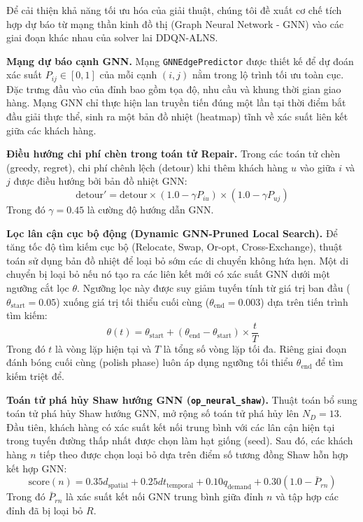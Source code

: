 \documentclass[13pt,a4paper]{extarticle}
\begin{document}
Để cải thiện khả năng tối ưu hóa của giải thuật, chúng tôi đề xuất cơ chế tích hợp dự báo từ mạng thần kinh đồ thị (Graph Neural Network - GNN) vào các giai đoạn khác nhau của solver lai DDQN-ALNS.

\textbf{Mạng dự báo cạnh GNN.}
Mạng \texttt{GNNEdgePredictor} được thiết kế để dự đoán xác suất $P_{ij} \in [0, 1]$ của mỗi cạnh $(i, j)$ nằm trong lộ trình tối ưu toàn cục. Đặc trưng đầu vào của đỉnh bao gồm tọa độ, nhu cầu và khung thời gian giao hàng. Mạng GNN chỉ thực hiện lan truyền tiến đúng một lần tại thời điểm bắt đầu giải thực thể, sinh ra một bản đồ nhiệt (heatmap) tĩnh về xác suất liên kết giữa các khách hàng.

\textbf{Điều hướng chi phí chèn trong toán tử Repair.}
Trong các toán tử chèn (greedy, regret), chi phí chênh lệch (detour) khi thêm khách hàng $u$ vào giữa $i$ và $j$ được điều hướng bởi bản đồ nhiệt GNN:
\begin{equation}
  \text{detour}' = \text{detour} \times \left(1.0 - \gamma P_{iu}\right) \times \left(1.0 - \gamma P_{uj}\right)
\end{equation}
Trong đó $\gamma = 0.45$ là cường độ hướng dẫn GNN.

\textbf{Lọc lân cận cục bộ động (Dynamic GNN-Pruned Local Search).}
Để tăng tốc độ tìm kiếm cục bộ (Relocate, Swap, Or-opt, Cross-Exchange), thuật toán sử dụng bản đồ nhiệt để loại bỏ sớm các di chuyển không hứa hẹn. Một di chuyển bị loại bỏ nếu nó tạo ra các liên kết mới có xác suất GNN dưới một ngưỡng cắt lọc $\theta$. Ngưỡng lọc này được suy giảm tuyến tính từ giá trị ban đầu ($\theta_{\text{start}} = 0.05$) xuống giá trị tối thiểu cuối cùng ($\theta_{\text{end}} = 0.003$) dựa trên tiến trình tìm kiếm:
\begin{equation}
  \theta(t) = \theta_{\text{start}} + (\theta_{\text{end}} - \theta_{\text{start}}) \times \frac{t}{T}
\end{equation}
Trong đó $t$ là vòng lặp hiện tại và $T$ là tổng số vòng lặp tối đa. Riêng giai đoạn đánh bóng cuối cùng (polish phase) luôn áp dụng ngưỡng tối thiểu $\theta_{\text{end}}$ để tìm kiếm triệt để.

\textbf{Toán tử phá hủy Shaw hướng GNN (\texttt{op\_neural\_shaw}).}
Thuật toán bổ sung toán tử phá hủy Shaw hướng GNN, mở rộng số toán tử phá hủy lên $N_D = 13$. Đầu tiên, khách hàng có xác suất kết nối trung bình với các lân cận hiện tại trong tuyến đường thấp nhất được chọn làm hạt giống (seed). Sau đó, các khách hàng $n$ tiếp theo được chọn loại bỏ dựa trên điểm số tương đồng Shaw hỗn hợp kết hợp GNN:
\begin{equation}
  \text{score}(n) = 0.35 d_{\text{spatial}} + 0.25 dt_{\text{temporal}} + 0.10 q_{\text{demand}} + 0.30 \left(1.0 - \bar{P}_{rn}\right)
\end{equation}
Trong đó $\bar{P}_{rn}$ là xác suất kết nối GNN trung bình giữa đỉnh $n$ và tập hợp các đỉnh đã bị loại bỏ $R$.
\end{document}
